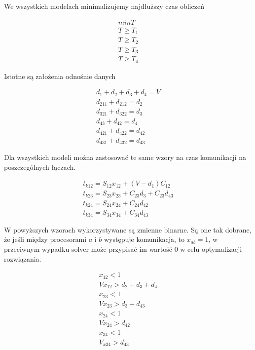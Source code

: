 We wszystkich modelach minimalizujemy najdłuższy czas obliczeń

\begin{equation} \label{eq:min}
\begin{array}{l}
min T \\
T \geq T_{1} \\
T \geq T_{2} \\
T \geq T_{3} \\
T \geq T_{4}
\end{array}
\end{equation}

Istotne są założenia odnośnie danych

\begin{equation} \label{eq:data}
\begin{array}{l}
d_{1} + d_{2} + d_{3} + d_{4} = V \\
d_{211} + d_{212} = d_{2} \\
d_{321} + d_{322} = d_{3} \\
d_{43} + d_{42} = d_{4} \\
d_{421} + d_{422} = d_{42} \\
d_{431} + d_{432} = d_{43}
\end{array}
\end{equation}

Dla wszystkich modeli można zastosować te same wzory na czas komunikacji na poszczególnych łączach.

\begin{equation} \label{eq:tk}
\begin{array}{l}
t_{k12} = S_{12}x_{12} + (V - d_{1})C_{12} \\
t_{k23} = S_{23}x_{23} + C_{23}d_{3} + C_{23}d_{43} \\
t_{k24} = S_{24}x_{24} + C_{24}d_{42} \\
t_{k34} = S_{34}x_{34} + C_{34}d_{43}
\end{array}
\end{equation}

W powyższych wzorach wykorzystywane są zmienne binarne. Są one tak dobrane, że jeśli między procesorami $a$ i $b$ występuje komunikacja,
to $x_{ab} = 1$, w przeciwnym wypadku solver może przypisać im wartość $0$ w celu optymalizacji rozwiązania.

\begin{equation} \label{eq:x}
\begin{array}{l}
x_{12} < 1 \\
Vx_{12} > d_{2} + d_{3} + d_{4} \\
x_{23} < 1 \\
Vx_{23} > d_{3} + d_{43} \\
x_{24} < 1 \\
Vx_{24} > d_{42} \\
x_{34} < 1 \\
V_{x34} > d_{43}
\end{array}
\end{equation}

